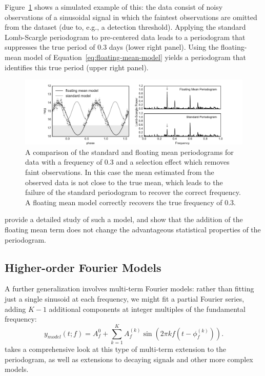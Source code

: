 \documentclass[preprint]{aastex}
\newcommand{\Fig}[1]{Figure~\ref{fig:#1}}
\newcommand{\figlabel}[1]{\label{fig:#1}}
\newcommand{\Eq}[1]{Equation~\ref{eq:#1}}
\newcommand{\eq}[1]{\Eq{#1}}
\newcommand{\sectlabel}[1]{\label{sect:#1}}
\begin{document}
\Fig{standard-vs-floatingmean} shows a simulated example of this: the data
consist of noisy observations of a sinusoidal signal in which the faintest
observations are omitted from the dataset (due to, e.g., a detection threshold).
Applying the standard Lomb-Scargle periodogram to pre-centered data leads to a
periodogram that suppresses the true period of 0.3 days (lower right panel).
Using the floating-mean model of \eq{floating-mean-model} yields a periodogram
that identifies this true period (upper right panel).

\begin{figure}[ht]
  \centering
  \includegraphics[width=\textwidth]{fig20_standard_vs_floatingmean}
  \caption{A comparison of the standard and floating mean periodograms for
    data with a frequency of 0.3 and a selection effect which removes
    faint observations.
    In this case the mean estimated from the observed data is not close to
    the true mean, which leads to the failure of the standard periodogram to
    recover the correct frequency. A floating mean model correctly recovers
    the true frequency of 0.3.
    \figlabel{standard-vs-floatingmean}}
\end{figure}

\citet{Zechmeister09} provide a detailed study of such a model,
and show that the addition of the floating mean term does not change
the advantageous statistical properties of the periodogram.

\subsection{Higher-order Fourier Models}
\sectlabel{multiterm}

A further generalization involves multi-term Fourier models:
rather than fitting just a single sinusoid at each frequency, we might fit a
partial Fourier series, adding $K-1$ additional components at
integer multiples of the fundamental frequency:
\begin{equation}
  y_{model}(t;f) = A_f^{0} + \sum_{k=1}^K A_f^{(k)} \sin(2\pi k f (t - \phi_f^{(k)})).
\end{equation}
\citet{Bretthorst88} takes a comprehensive look at this type of multi-term
extension to the periodogram, as well as extensions to decaying signals and
other more complex models.
\end{document}
